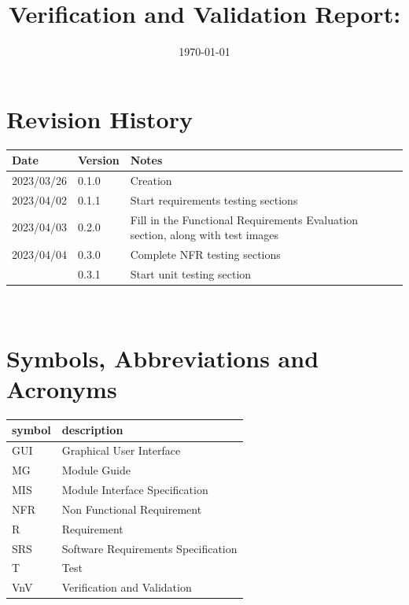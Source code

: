 \documentclass[12pt, titlepage]{article}
\begin{document}
\title{Verification and Validation Report: \progname} 
\author{\authname}
\date{\today}
	
\maketitle


\section{Revision History}

\begin{tabularx}{\textwidth}{p{3cm}p{2cm}X}
\toprule {\bf Date} & {\bf Version} & {\bf Notes}\\
\midrule
2023/03/26 & 0.1.0 & Creation\\
2023/04/02 & 0.1.1 & Start requirements testing sections\\
2023/04/03 & 0.2.0 & Fill in the Functional Requirements Evaluation
  section, along with test images\\
2023/04/04 & 0.3.0 & Complete NFR testing sections\\
           & 0.3.1 & Start unit testing section\\
\bottomrule
\end{tabularx}

~\newpage

\section{Symbols, Abbreviations and Acronyms}

\renewcommand{\arraystretch}{1.2}
\begin{tabular}{l l} 
  \toprule		
  \textbf{symbol} & \textbf{description}\\
  \midrule 
  GUI & Graphical User Interface\\
  MG & Module Guide\\
  MIS & Module Interface Specification\\
  NFR & Non Functional Requirement\\
  R & Requirement\\
  SRS & Software Requirements Specification\\
  T & Test\\
  VnV & Verification and Validation\\
  \bottomrule
\end{tabular}\\
\end{document}
